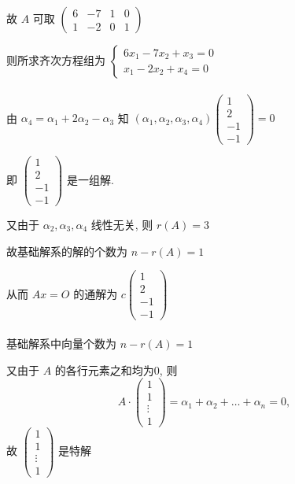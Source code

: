          故 \( A \) 可取 \( \begin{pmatrix}
             6 & -7 & 1 & 0 \\
             1 & -2 & 0 & 1
         \end{pmatrix} \)

         则所求齐次方程组为 \( \begin{cases}
             6x_{1} - 7x_{2} + x_{3} = 0 \\
             x_{1} - 2x_{2} + x_{4} = 0
         \end{cases} \)


     \paragraph{} %
         由 \( \alpha_{4} = \alpha_{1} + 2\alpha_{2} - \alpha_{3} \) 知 \( (\alpha_{1}, \alpha_{2}, \alpha_{3}, \alpha_{4}) \begin{pmatrix}
             1  \\
             2  \\
             -1 \\
             -1
         \end{pmatrix} = 0 \)

         即 \( \begin{pmatrix}
             1  \\
             2  \\
             -1 \\
             -1
         \end{pmatrix} \) 是一组解.

         又由于 \( \alpha_{2}, \alpha_{3}, \alpha_{4} \) 线性无关, 则 \( r(A) = 3 \)

         故基础解系的解的个数为 \( n - r(A) = 1 \)

         从而 \( Ax = O \) 的通解为 \( c \begin{pmatrix}
             1  \\
             2  \\
             -1 \\
             -1
         \end{pmatrix} \)


     \paragraph{} %
         基础解系中向量个数为 \( n - r(A) = 1 \)

         又由于 \( A \) 的各行元素之和均为0, 则
         \[ A \cdot \begin{pmatrix}
                 1      \\
                 1      \\
                 \vdots \\
                 1
             \end{pmatrix} = \alpha_{1} + \alpha_{2} + \dots + \alpha_{n} = 0, \] 故 \( \begin{pmatrix}
             1      \\
             1      \\
             \vdots \\
             1
         \end{pmatrix} \) 是特解

